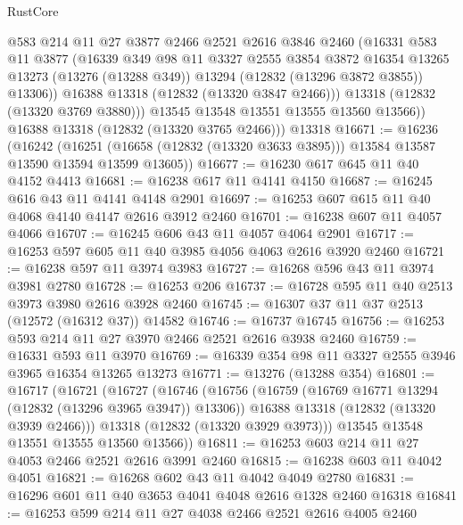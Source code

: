 \begin{lexlean}{RustCore}
\begin{coremodule}
              @583
              @214
              @11
              @27
              @3877
              @2466
              @2521
              @2616
              @3846
              @2460
              (@16331
                @583
                @11
                @3877
                (@16339
                  @349
                  @98
                  @11
                  @3327
                  @2555
                  @3854
                  @3872
                  @16354
                  @13265
                  @13273
                  (@13276 (@13288 @349))
                  @13294
                  (@12832 (@13296 @3872 @3855))
                  @13306))
              @16388
              @13318
              (@12832 (@13320 @3847 @2466)))
            @13318
            (@12832 (@13320 @3769 @3880)))
          @13545
          @13548
          @13551
          @13555
          @13560
          @13566))
      @16388
      @13318
      (@12832 (@13320 @3765 @2466)))
    @13318
@16671 := @16236
    (@16242
      (@16251 (@16658 (@12832 (@13320 @3633 @3895))) @13584 @13587 @13590 @13594 @13599 @13605))
@16677 := @16230 @617 @645 @11 @40 @4152 @4413
@16681 := @16238 @617 @11 @4141 @4150
@16687 := @16245 @616 @43 @11 @4141 @4148 @2901
@16697 := @16253 @607 @615 @11 @40 @4068 @4140 @4147 @2616 @3912 @2460
@16701 := @16238 @607 @11 @4057 @4066
@16707 := @16245 @606 @43 @11 @4057 @4064 @2901
@16717 := @16253 @597 @605 @11 @40 @3985 @4056 @4063 @2616 @3920 @2460
@16721 := @16238 @597 @11 @3974 @3983
@16727 := @16268 @596 @43 @11 @3974 @3981 @2780
@16728 := @16253 @206
@16737 := @16728 @595 @11 @40 @2513 @3973 @3980 @2616 @3928 @2460
@16745 := @16307 @37 @11 @37 @2513 (@12572 (@16312 @37)) @14582
@16746 := @16737 @16745
@16756 := @16253 @593 @214 @11 @27 @3970 @2466 @2521 @2616 @3938 @2460
@16759 := @16331 @593 @11 @3970
@16769 := @16339 @354 @98 @11 @3327 @2555 @3946 @3965 @16354 @13265 @13273
@16771 := @13276 (@13288 @354)
@16801 := @16717
    (@16721
      (@16727
        (@16746
          (@16756
            (@16759 (@16769 @16771 @13294 (@12832 (@13296 @3965 @3947)) @13306))
            @16388
            @13318
            (@12832 (@13320 @3939 @2466)))
          @13318
          (@12832 (@13320 @3929 @3973)))
        @13545
        @13548
        @13551
        @13555
        @13560
        @13566))
@16811 := @16253 @603 @214 @11 @27 @4053 @2466 @2521 @2616 @3991 @2460
@16815 := @16238 @603 @11 @4042 @4051
@16821 := @16268 @602 @43 @11 @4042 @4049 @2780
@16831 := @16296 @601 @11 @40 @3653 @4041 @4048 @2616 @1328 @2460 @16318
@16841 := @16253 @599 @214 @11 @27 @4038 @2466 @2521 @2616 @4005 @2460

\end{coremodule}
\end{lexlean}
